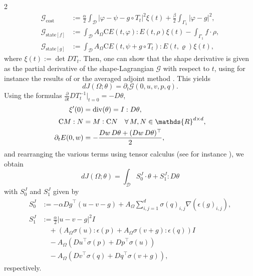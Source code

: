 \documentclass[a4paper, oneside]{article}
\newcommand{\tred}{\textcolor{red}}
\begin{document}
\begin{multicols}{2}
\begin{align*}
	\mathcal{G}_{\mathrm{cost}}     &:= \frac{\alpha}{2}\int_{\mathcal{D}}\left|\varphi-\psi-g\circ T_{t}\right|^{2}\xi(t)+\frac{\beta}{2}\int_{\Gamma_{1}}\left|\varphi-g\right|^{2}, \\
	\mathcal{G}_{\mathrm{state}[f]} &:= \int_{\mathcal{D}}A_{\Omega}\mathrm{C}E(t,\varphi):E(t,\rho)\xi(t)-\int_{\Gamma_{1}}f\cdot\rho, \\
	\mathcal{G}_{\mathrm{state}[g]} &:= \int_{\mathcal{D}}A_{\Omega}\mathrm{C}E(t,\psi + g\circ T_{t}):E(t,\varrho)\xi(t),
\end{align*}
where $\xi(t):=\det DT_t$.
Then, one can show that the shape derivative is given as the partial derivative of the shape-Lagrangian $\mathcal{G}$ with respect to $t$, using for instance the results of \cite[Chapter~10, Section~5.4]{MR2731611} or the averaged adjoint method \cite{MR3535238}.
This yields
\begin{equation}
	dJ(\Omega; \theta) = \partial_{t}\mathcal{G}(0, u, v, p, q).
\end{equation}
Using the formulas $\frac{\partial}{\partial t} DT_{t}^{-1}|_{t=0} =-D\theta$,   
\begin{align*}
	\xi'(0) & = \operatorname{div}(\theta) = I : D\theta,\\
	\mathrm{C}M:N &= M\vcentcolon\mathrm{C}N \quad \forall\,M,N\in\mathds{R}^{d\times d},\\
	\partial_t E(0,w) &= -\frac{Dw\,D\theta + (Dw\,D\theta)^\top}{2},
\end{align*}
and rearranging the various terms using tensor calculus (see for instance \cite[Lemma 2.2]{MR4531392}), we obtain
\begin{equation}\label{eq:SDelast_inv}
	dJ(\Omega; \theta) = \int_{\mathcal{D}} S_0^J \cdot \theta + S_1^J : D\theta 
\end{equation}
with $S_0^J$ and $S_1^J$ given by
\begin{align*}
	S^{J}_{0} & := -\alpha{Dg}^{\top}(u - v - g) +
	A_{\Omega}\sum_{i,j=1}^{d}{\sigma (q)}_{i,j}\nabla(\epsilon(g)_{i,j}),\\
	S^{J}_{1} & := \frac{\alpha}{2}{|u-v-g|}^2 I\\
			  & \quad + \left(A_{\Omega}\sigma(u):\epsilon(p) + A_{\Omega}\sigma(v+g):\epsilon(q)\right)I\\
			  & \quad - A_{\Omega} \left({Du}^{\top}\sigma(p) + {Dp}^{\top}\sigma(u)\right)\\
			  & \quad - A_{\Omega} \left({Dv}^{\top}\sigma(q) + {Dq}^{\top}\sigma(v+g)\right),
\end{align*}
respectively.



\end{multicols}
\end{document}
